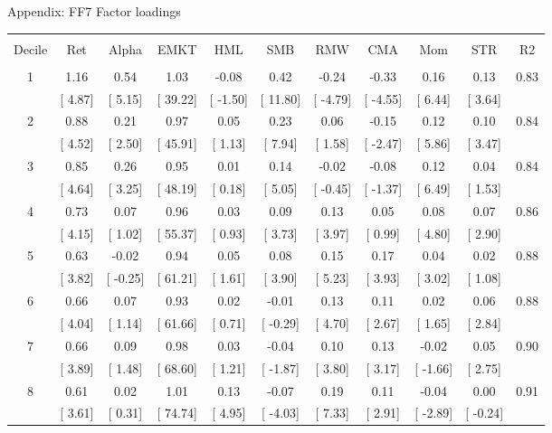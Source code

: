 \documentclass{beamer}
\begin{document}
{\renewcommand{\arraystretch}{0.95}
\begin{frame}{Appendix: FF7 Factor loadings}
\vspace{-0.5cm}
\begin{table}[!htbp] \centering 
\begin{tabular}{@{\extracolsep{-5pt}} ccccccccccc} 
\\[-1.8ex]\hline 
\hline \\[-1.8ex] 
Decile & Ret & Alpha & EMKT & HML & SMB & RMW & CMA & Mom & STR & R2 \\ 
\hline \\[-1.8ex] 
1 & 1.16 & 0.54 & 1.03 & -0.08 & 0.42 & -0.24 & -0.33 & 0.16 & 0.13 & 0.83 \\ 
 & [ 4.87] & [ 5.15] & [ 39.22] & [ -1.50] & [ 11.80] & [ -4.79] & [ -4.55] & [ 6.44] & [ 3.64] &  \\ 
2 & 0.88 & 0.21 & 0.97 & 0.05 & 0.23 & 0.06 & -0.15 & 0.12 & 0.10 & 0.84 \\ 
 & [ 4.52] & [ 2.50] & [ 45.91] & [ 1.13] & [ 7.94] & [ 1.58] & [ -2.47] & [ 5.86] & [ 3.47] &  \\ 
3 & 0.85 & 0.26 & 0.95 & 0.01 & 0.14 & -0.02 & -0.08 & 0.12 & 0.04 & 0.84 \\ 
 & [ 4.64] & [ 3.25] & [ 48.19] & [ 0.18] & [ 5.05] & [ -0.45] & [ -1.37] & [ 6.49] & [ 1.53] &  \\ 
4 & 0.73 & 0.07 & 0.96 & 0.03 & 0.09 & 0.13 & 0.05 & 0.08 & 0.07 & 0.86 \\ 
 & [ 4.15] & [ 1.02] & [ 55.37] & [ 0.93] & [ 3.73] & [ 3.97] & [ 0.99] & [ 4.80] & [ 2.90] &  \\ 
5 & 0.63 & -0.02 & 0.94 & 0.05 & 0.08 & 0.15 & 0.17 & 0.04 & 0.02 & 0.88 \\ 
 & [ 3.82] & [ -0.25] & [ 61.21] & [ 1.61] & [ 3.90] & [ 5.23] & [ 3.93] & [ 3.02] & [ 1.08] &  \\ 
6 & 0.66 & 0.07 & 0.93 & 0.02 & -0.01 & 0.13 & 0.11 & 0.02 & 0.06 & 0.88 \\ 
 & [ 4.04] & [ 1.14] & [ 61.66] & [ 0.71] & [ -0.29] & [ 4.70] & [ 2.67] & [ 1.65] & [ 2.84] &  \\ 
7 & 0.66 & 0.09 & 0.98 & 0.03 & -0.04 & 0.10 & 0.13 & -0.02 & 0.05 & 0.90 \\ 
 & [ 3.89] & [ 1.48] & [ 68.60] & [ 1.21] & [ -1.87] & [ 3.80] & [ 3.17] & [ -1.66] & [ 2.75] &  \\ 
8 & 0.61 & 0.02 & 1.01 & 0.13 & -0.07 & 0.19 & 0.11 & -0.04 & 0.00 & 0.91 \\ 
 & [ 3.61] & [ 0.31] & [ 74.74] & [ 4.95] & [ -4.03] & [ 7.33] & [ 2.91] & [ -2.89] & [ -0.24] &  \\ 

\end{tabular}
\end{table}
\end{frame}}
\end{document}
